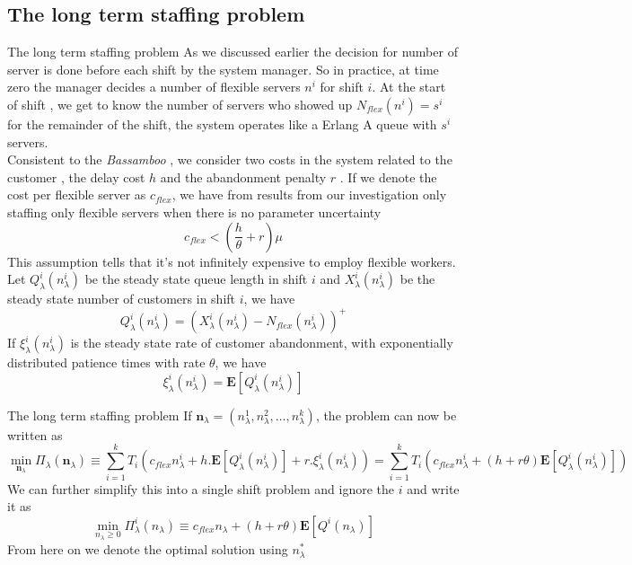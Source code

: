 \documentclass[8pt]{beamer}
\begin{document}
\subsection{The long term staffing problem}
\begin{frame}{The long term staffing problem}
    As we discussed earlier the decision for number of server is done before each shift by the system manager. So in practice, at time zero the manager decides a number of flexible servers $n^i$ for shift $i$. At the start of shift , we get to know the number of servers who showed up $N_{flex}(n^i)=s^i$ for the remainder of the shift, the system operates like a Erlang A queue with $s^i$ servers.
\\ Consistent to the \textit{Bassamboo}\cite{bassamboo} , we consider two costs in the system related to the customer , the delay cost $h$ and the abandonment penalty $r$ . If we denote the cost per flexible server as $c_{flex}$, we have from results from our investigation only staffing only flexible servers when there is no parameter uncertainty
$$c_{flex} < (\frac{h}{\theta}+r)\mu$$ This assumption tells that it's not infinitely expensive to employ flexible workers.
\\ Let ${Q}_{\lambda}^{i}(n_\lambda^{i})$ be the steady state queue length in shift $i$ and ${X}_{\lambda}^{i}(n_\lambda^{i})$ be the steady state number of customers in shift $i$, we have
$${Q}_{\lambda}^{i}(n_\lambda^{i})=({X}_{\lambda}^{i}(n_\lambda^{i})-N_{flex}(n_\lambda^{i}))^{+}$$
If ${\xi}_{\lambda}^{i}(n_\lambda^{i})$ is the steady state rate of customer abandonment, with exponentially distributed patience times with rate $\theta$, we have
$${\xi}_{\lambda}^{i}(n_\lambda^{i})=\mathbf{E}[{Q}_{\lambda}^{i}(n_\lambda^{i})]$$

\end{frame}
\begin{frame}{The long term staffing problem}
    If $\textbf{n}_\lambda = (n_\lambda^1,n_\lambda^2,\hdots,n_\lambda^k)$, the problem can now be written as
 \begin{equation}
     \min_{\textbf{n}_\lambda} {\Pi}_{\lambda}(\textbf{n}_\lambda)
    \equiv \sum_{i=1}^{k}{T_{i}(c_{flex}n_\lambda^{i}+h.\mathbf{E}[{Q}_{\lambda}^{i}(n_\lambda^{i})]+r.{\xi}_{\lambda}^{i}(n_\lambda^{i}))}
    =\sum_{i=1}^{k}{T_{i}(c_{flex}n_\lambda^{i}+(h+r\theta)\mathbf{E}[{Q}_{\lambda}^{i}(n_\lambda^{i})])}
\end{equation}
We can further simplify this into a single shift problem and ignore the $i$ and write it as
\begin{equation}
    \min_{{n}_\lambda \geq 0} {\Pi}_{\lambda}^i({n}_\lambda) \equiv c_{flex}n_\lambda+(h+r\theta)\mathbf{E}[{Q}^i(n_\lambda)]
\end{equation}
From here on we denote the optimal solution using $n_\lambda^{*}$
\end{frame}
\end{document}
